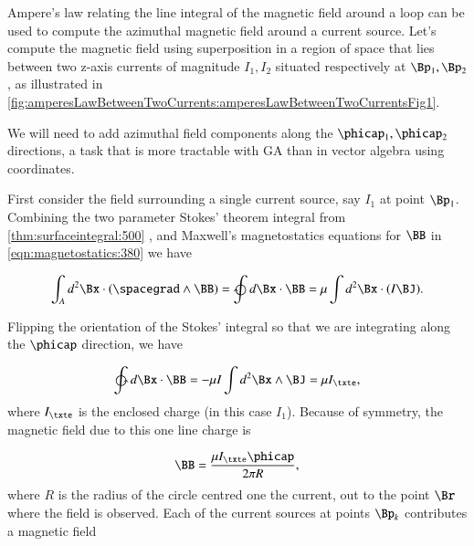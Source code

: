 %
%

Ampere's law relating the line integral of the magnetic field around a loop can be used to compute the azimuthal magnetic field around a current source.
Let's compute the magnetic field using superposition in a region of space that lies between two z-axis currents of magnitude \( I_1, I_2 \) situated respectively at \( \Bp_1, \Bp_2 \), as illustrated in
\cref{fig:amperesLawBetweenTwoCurrents:amperesLawBetweenTwoCurrentsFig1}.


We will need to add azimuthal field components along the \( \phicap_1, \phicap_2 \) directions, a task that is more tractable with GA than in vector algebra using coordinates.

First consider the field surrounding a single current source, say \( I_1 \) at point \( \Bp_1 \).
Combining the two parameter Stokes' theorem integral from 
\cref{thm:surfaceintegral:500}
, and Maxwell's magnetostatics equations for \( \BB \) in \cref{eqn:magnetostatics:380} we have

\begin{dmath}\label{eqn:amperesLawMagnetostaticsExample:20}
\int_A d^2 \Bx \cdot (\spacegrad \wedge \BB) = \ointclockwise d\Bx \cdot \BB = \mu \int d^2 \Bx \cdot (I \BJ).
\end{dmath}

Flipping the orientation of the Stokes' integral so that we are integrating along the \( \phicap \) direction, we have

\begin{dmath}\label{eqn:amperesLawMagnetostaticsExample:40}
\ointctrclockwise d\Bx \cdot \BB
= -\mu I \int d^2 \Bx \wedge \BJ
= \mu I_\txte,
\end{dmath}
where \( I_\txte \) is the enclosed charge (in this case \( I_1 \)).
Because of symmetry, the magnetic field due to this one line charge is

\begin{dmath}\label{eqn:amperesLawMagnetostaticsExample:60}
\BB
= \frac{\mu I_\txte \phicap}{2 \pi R},
\end{dmath}
where \( R \) is the radius of the circle centred one the current, out to the point \( \Br \) where the field is observed.
Each of the current sources at points \( \Bp_k \) contributes a magnetic field

